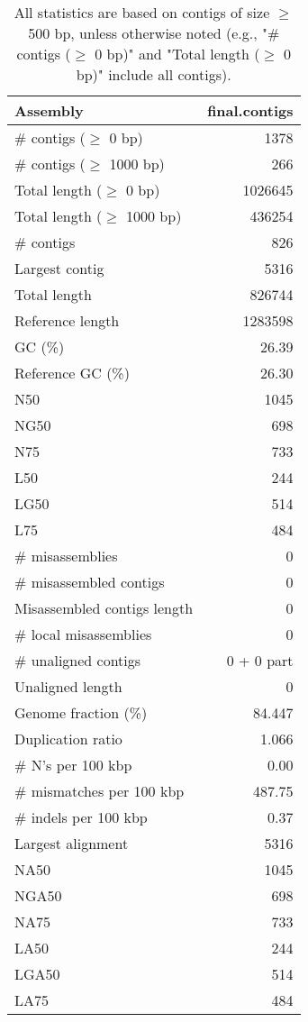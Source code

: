 \documentclass[12pt,a4paper]{article}
\begin{document}
\begin{table}[ht]
\begin{center}
\caption{All statistics are based on contigs of size $\geq$ 500 bp, unless otherwise noted (e.g., "\# contigs ($\geq$ 0 bp)" and "Total length ($\geq$ 0 bp)" include all contigs).}
\begin{tabular}{|l*{1}{|r}|}
\hline
Assembly & final.contigs \\ \hline
\# contigs ($\geq$ 0 bp) & 1378 \\ \hline
\# contigs ($\geq$ 1000 bp) & 266 \\ \hline
Total length ($\geq$ 0 bp) & 1026645 \\ \hline
Total length ($\geq$ 1000 bp) & 436254 \\ \hline
\# contigs & 826 \\ \hline
Largest contig & 5316 \\ \hline
Total length & 826744 \\ \hline
Reference length & 1283598 \\ \hline
GC (\%) & 26.39 \\ \hline
Reference GC (\%) & 26.30 \\ \hline
N50 & 1045 \\ \hline
NG50 & 698 \\ \hline
N75 & 733 \\ \hline
L50 & 244 \\ \hline
LG50 & 514 \\ \hline
L75 & 484 \\ \hline
\# misassemblies & 0 \\ \hline
\# misassembled contigs & 0 \\ \hline
Misassembled contigs length & 0 \\ \hline
\# local misassemblies & 0 \\ \hline
\# unaligned contigs & 0 + 0 part \\ \hline
Unaligned length & 0 \\ \hline
Genome fraction (\%) & 84.447 \\ \hline
Duplication ratio & 1.066 \\ \hline
\# N's per 100 kbp & 0.00 \\ \hline
\# mismatches per 100 kbp & 487.75 \\ \hline
\# indels per 100 kbp & 0.37 \\ \hline
Largest alignment & 5316 \\ \hline
NA50 & 1045 \\ \hline
NGA50 & 698 \\ \hline
NA75 & 733 \\ \hline
LA50 & 244 \\ \hline
LGA50 & 514 \\ \hline
LA75 & 484 \\ \hline
\end{tabular}
\end{center}
\end{table}
\end{document}
